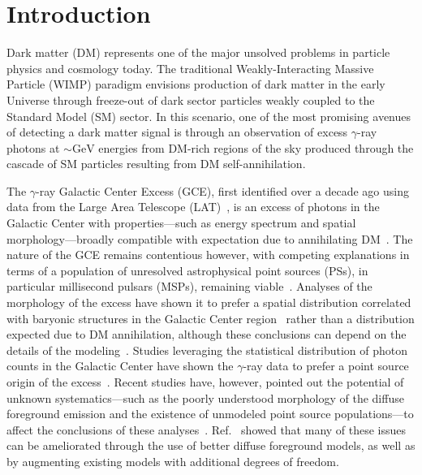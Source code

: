 \documentclass[prd,aps,10pt,nofootinbib,twocolumn,superscriptaddress,preprintnumbers,balancelastpage,longbibliography]{revtex4-1}
\begin{document}
\maketitle

\section{Introduction}
\label{sec:intro}

Dark matter (DM) represents one of the major unsolved problems in particle physics and cosmology today. The traditional Weakly-Interacting Massive Particle (WIMP) paradigm envisions production of dark matter in the early Universe through freeze-out of dark sector particles weakly coupled to the Standard Model (SM) sector. In this scenario, one of the most promising avenues of detecting a dark matter signal is through an observation of excess $\gamma$-ray photons at $\sim\mathrm{GeV}$ energies from DM-rich regions of the sky produced through the cascade of SM particles resulting from DM self-annihilation. 

The \Fermi $\gamma$-ray Galactic Center Excess (GCE), first identified over a decade ago using data from the \Fermi Large Area Telescope (LAT)~\cite{Atwood:2009ez}, is an excess of photons in the Galactic Center with properties---such as energy spectrum and spatial morphology---broadly compatible with expectation due to annihilating DM~\cite{Goodenough:2009gk,Hooper:2010mq,Boyarsky:2010dr,Hooper:2011ti,Abazajian:2012pn,Hooper:2013rwa,Gordon:2013vta,Abazajian:2014fta,Daylan:2014rsa,Calore:2014xka,Abazajian:2014hsa,TheFermi-LAT:2015kwa,Linden:2016rcf,Macias:2016nev,Clark:2016mbb}. The nature of the GCE remains contentious however, with competing explanations in terms of a population of unresolved astrophysical point sources (PSs), in particular millisecond pulsars (MSPs), remaining viable~\cite{Abazajian:2014fta,Abazajian:2010zy,Hooper:2013nhl,Calore:2014oga,Cholis:2014lta,Petrovic:2014xra,Yuan:2014yda,Brandt:2015ula,Gautam:2021wqn,Ploeg:2020jeh}. Analyses of the morphology of the excess have shown it to prefer a spatial distribution correlated with baryonic structures in the Galactic Center region~\cite{Macias:2016nev,Macias:2019omb,Bartels:2017vsx} rather than a distribution expected due to DM annihilation, although these conclusions can depend on the details of the modeling~\cite{DiMauro:2020rcr,DiMauro:2021raz}. Studies leveraging the statistical distribution of photon counts in the Galactic Center have shown the $\gamma$-ray data to prefer a point source origin of the excess~\cite{Lee:2015fea,Bartels:2015aea,Buschmann:2020adf,Chang:2019ars}. Recent studies have, however, pointed out the potential of unknown systematics---such as the poorly understood morphology of the diffuse foreground emission and the existence of unmodeled point source populations---to affect the conclusions of these analyses~\cite{Leane:2020nmi,Leane:2020pfc,Leane:2019xiy}. Ref.~\cite{Buschmann:2020adf} showed that many of these issues can be ameliorated through the use of better diffuse foreground models, as well as by augmenting existing models with additional degrees of freedom.
\end{document}

